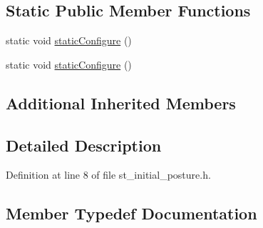 \subsection*{Static Public Member Functions}
\begin{DoxyCompactItemize}
\item 
static void \hyperlink{structsm__fetch__two__table__whiskey__pour_1_1StInitialPosture_a6ad91c966d0df4d8cf05c31ef87dc004}{static\+Configure} ()
\item 
static void \hyperlink{structsm__fetch__two__table__whiskey__pour_1_1StInitialPosture_a6ad91c966d0df4d8cf05c31ef87dc004}{static\+Configure} ()
\end{DoxyCompactItemize}
\subsection*{Additional Inherited Members}


\subsection{Detailed Description}


Definition at line 8 of file st\+\_\+initial\+\_\+posture.\+h.



\subsection{Member Typedef Documentation}
\mbox{\label{structsm__fetch__two__table__whiskey__pour_1_1StInitialPosture_ab03c2d4761715a726806196990af59f9}} 
